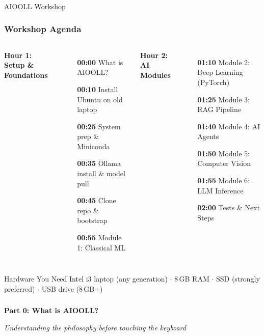 \begin{frame}[fragile]\frametitle{}

\begin{center}
{\Large AIOOLL Workshop}
\end{center}
\end{frame}

\begin{frame}[fragile]\frametitle{Workshop Agenda}
\begin{columns}
\textbf{Hour 1: Setup \& Foundations}
\begin{itemize}
  \item[\textbf{00:00}] What is AIOOLL?
  \item[\textbf{00:10}] Install Ubuntu on old laptop
  \item[\textbf{00:25}] System prep \& Miniconda
  \item[\textbf{00:35}] Ollama install \& model pull
  \item[\textbf{00:45}] Clone repo \& bootstrap
  \item[\textbf{00:55}] Module 1: Classical ML
\end{itemize}
\textbf{Hour 2: AI Modules}
\begin{itemize}
  \item[\textbf{01:10}] Module 2: Deep Learning (PyTorch)
  \item[\textbf{01:25}] Module 3: RAG Pipeline
  \item[\textbf{01:40}] Module 4: AI Agents
  \item[\textbf{01:50}] Module 5: Computer Vision
  \item[\textbf{01:55}] Module 6: LLM Inference
  \item[\textbf{02:00}] Tests \& Next Steps
\end{itemize}
\end{columns}
\vspace{0.4em}
\begin{block}{Hardware You Need}
Intel i3 laptop (any generation) $\cdot$ 8\,GB RAM $\cdot$ SSD (strongly preferred) $\cdot$ USB drive (8\,GB+)
\end{block}
\end{frame}

\begin{frame}[fragile]\frametitle{}
\begin{center}
{\Large \textbf{Part 0: What is AIOOLL?}}

\textit{Understanding the philosophy before touching the keyboard}
\end{center}
\end{frame}

